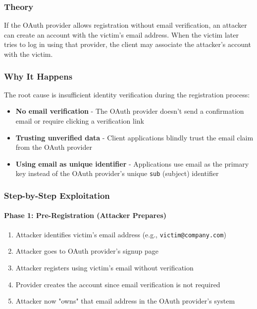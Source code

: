 \documentclass[12pt,a4paper]{article}
\begin{document}
\subsubsection{Theory}
If the OAuth provider allows registration without email verification, an attacker can create an account with the victim's email address. When the victim later tries to log in using that provider, the client may associate the attacker's account with the victim.

\subsubsection{Why It Happens}
The root cause is insufficient identity verification during the registration process:
\begin{itemize}
    \item \textbf{No email verification} - The OAuth provider doesn't send a confirmation email or require clicking a verification link
    \item \textbf{Trusting unverified data} - Client applications blindly trust the email claim from the OAuth provider
    \item \textbf{Using email as unique identifier} - Applications use email as the primary key instead of the OAuth provider's unique \texttt{sub} (subject) identifier
\end{itemize}


\subsubsection{Step-by-Step Exploitation}
\paragraph{Phase 1: Pre-Registration (Attacker Prepares)}
\begin{enumerate}
    \item Attacker identifies victim's email address (e.g., \texttt{victim@company.com})
    \item Attacker goes to OAuth provider's signup page
    \item Attacker registers using victim's email without verification
    \item Provider creates the account since email verification is not required
    \item Attacker now "owns" that email address in the OAuth provider's system
\end{enumerate}
\end{document}
